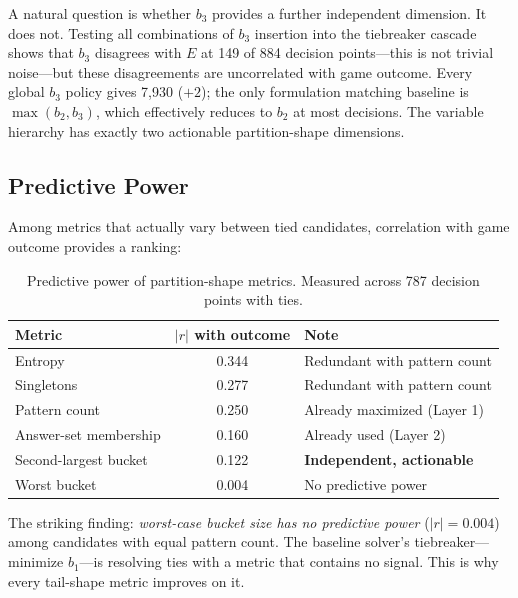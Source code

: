\documentclass[11pt]{article}
\begin{document}
	A natural question is whether $b_3$ provides a further independent dimension.  It does not.  Testing all combinations of $b_3$ insertion into the tiebreaker cascade shows that $b_3$ disagrees with $E$ at 149 of 884 decision points---this is not trivial noise---but these disagreements are uncorrelated with game outcome.  Every global $b_3$ policy gives 7,930 ($+2$); the only formulation matching baseline is $\max(b_2, b_3)$, which effectively reduces to $b_2$ at most decisions.  The variable hierarchy has exactly two actionable partition-shape dimensions.
	
	\subsection{Predictive Power}
	
	Among metrics that actually vary between tied candidates, correlation with game outcome provides a ranking:
	
	\begin{table}[h]
		\centering
		\caption{Predictive power of partition-shape metrics.  Measured across 787 decision points with ties.}
		\label{tab:predictive}
		\begin{tabular}{@{}lcl@{}}
			\toprule
			Metric & $|r|$ with outcome & Note \\
			\midrule
			Entropy & 0.344 & Redundant with pattern count \\
			Singletons & 0.277 & Redundant with pattern count \\
			Pattern count & 0.250 & Already maximized (Layer 1) \\
			Answer-set membership & 0.160 & Already used (Layer 2) \\
			Second-largest bucket & 0.122 & \textbf{Independent, actionable} \\
			Worst bucket & 0.004 & No predictive power \\
			\bottomrule
		\end{tabular}
	\end{table}
	
	The striking finding: \emph{worst-case bucket size has no predictive power} ($|r| = 0.004$) among candidates with equal pattern count.  The baseline solver's tiebreaker---minimize $b_1$---is resolving ties with a metric that contains no signal.  This is why every tail-shape metric improves on it.
	
\end{document}
